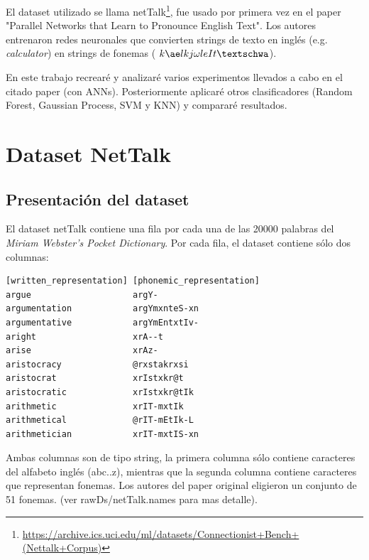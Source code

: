 \documentclass[paper=a4, fontsize=11pt]{scrartcl} %
\numberwithin{equation}{section} %
\numberwithin{figure}{section} %
\numberwithin{table}{section} %
\begin{document}
\par El dataset utilizado se llama netTalk\footnote{\url{https://archive.ics.uci.edu/ml/datasets/Connectionist+Bench+(Nettalk+Corpus)}}, fue usado por primera vez en el paper  "Parallel Networks that Learn to Pronounce English Text"\cite{parallel}. Los autores entrenaron redes neuronales que convierten strings de texto en inglés (e.g. \textit{calculator}) en strings de fonemas ( $k \ae lkj \omega leIt  \textschwa $).\\
    

\par En este trabajo recrearé y analizaré varios experimentos llevados a cabo en el citado paper (con ANNs). Posteriormente aplicaré otros clasificadores (Random Forest, Gaussian Process, SVM y KNN) y compararé resultados.

\section{Dataset NetTalk}

\subsection{Presentación del dataset}
El dataset netTalk contiene una fila por cada una de las 20000 palabras del \textit{Miriam Webster’s Pocket Dictionary}. Por cada fila, el dataset contiene sólo dos columnas: \\

\begin{center}

\begin{BVerbatim}
[written_representation] [phonemic_representation]
argue                    argY-   
argumentation            argYmxnteS-xn   
argumentative            argYmEntxtIv-   
aright                   xrA--t   
arise                    xrAz-   
aristocracy              @rxstakrxsi   
aristocrat               xrIstxkr@t   
aristocratic             xrIstxkr@tIk   
arithmetic               xrIT-mxtIk   
arithmetical             @rIT-mEtIk-L   
arithmetician            xrIT-mxtIS-xn   
\end{BVerbatim}

\end{center}

Ambas columnas son de tipo string, la primera columna sólo contiene caracteres del alfabeto inglés (abc..z), mientras que la segunda columna contiene caracteres que representan fonemas. Los autores del paper original eligieron un conjunto de 51 fonemas. (ver rawDs/netTalk.names para mas detalle).\\
\end{document}

